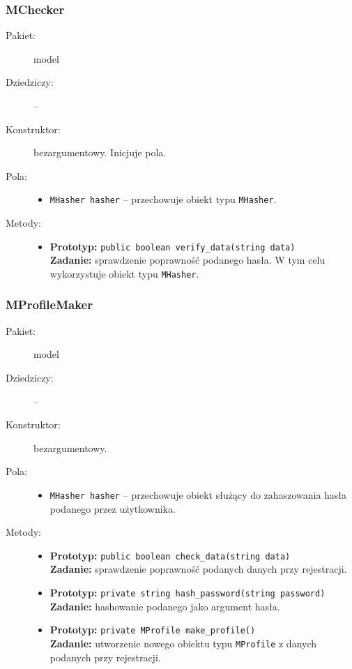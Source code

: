 \documentclass[a4paper]{article}
\newcommand{\prog}{\texttt}
\begin{document}
\subsubsection{MChecker}
\begin{description}
    \item[Pakiet:] model
    \item[Dziedziczy:] --
    \item[Konstruktor:] bezargumentowy. Inicjuje pola.
    \item[Pola:] \hfill
    \begin{itemize}
        \item \prog{MHasher hasher} -- przechowuje obiekt typu \prog{MHasher}.
    \end{itemize}
    \item[Metody:] \hfill
    \begin{itemize}
        \item \textbf{Prototyp:} \prog{public boolean verify\_data(string data)}\\\textbf{Zadanie:} sprawdzenie poprawność podanego hasła. W tym celu wykorzystuje obiekt typu \prog{MHasher}.
    \end{itemize}
\end{description}

\subsubsection{MProfileMaker}
\begin{description}
    \item[Pakiet:] model
    \item[Dziedziczy:] --
    \item[Konstruktor:] bezargumentowy.
    \item[Pola:] \hfill
    \begin{itemize}
        \item \prog{MHasher hasher} -- przechowuje obiekt służący do zahaszowania hasła podanego przez użytkownika.
    \end{itemize}
    \item[Metody:] \hfill
    \begin{itemize}
        \item \textbf{Prototyp:} \prog{public boolean check\_data(string data)}\\\textbf{Zadanie:} sprawdzenie poprawność podanych danych przy rejestracji.
        \item \textbf{Prototyp:} \prog{private string hash\_password(string password)}\\\textbf{Zadanie:} hashowanie podanego jako argument hasła.
        \item \textbf{Prototyp:} \prog{private MProfile make\_profile()}\\\textbf{Zadanie:} utworzenie nowego obiektu typu \prog{MProfile} z danych podanych przy rejestracji.
    \end{itemize}
\end{description}
\end{document}
